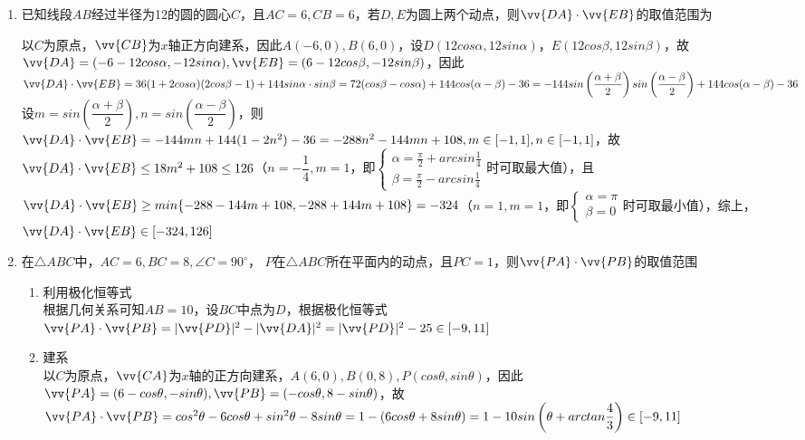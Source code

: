 \begin{enumerate}
\item 已知线段$AB$经过半径为12的圆的圆心$C$，且$AC=6, CB = 6$，若$D, E$为圆上两个动点，则$\vv{DA} \cdot \vv{EB}$的取值范围为\blkda[3]{$[-324, 126]$}
\begin{jieda}
    以$C$为原点，$\vv{CB}$为$x$轴正方向建系，因此$A(-6, 0), B(6, 0)$，设$D(12cos\alpha, 12sin\alpha)$，$E(12cos\beta, 12sin\beta)$，故$\vv{DA} = (-6-12cos\alpha, -12sin\alpha), \vv{EB} = (6 - 12cos\beta, -12sin\beta)$，因此$\vv{DA} \cdot \vv{EB} = 36(1+2cos\alpha)(2cos\beta-1) + 144 sin\alpha \cdot sin\beta = 72( cos\beta- cos\alpha ) + 144cos(\alpha - \beta) - 36 = -144sin\left(\dfrac{\alpha+\beta}{2}\right)sin\left(\dfrac{\alpha-\beta}{2}\right) + 144cos(\alpha - \beta) - 36$\\
    设$m = sin\left(\dfrac{\alpha+\beta}{2}\right), n = sin\left(\dfrac{\alpha-\beta}{2}\right)$，则$\vv{DA} \cdot \vv{EB} = -144mn + 144(1-2n^2) - 36 = -288n^2-144mn+108, m \in [-1, 1], n \in [-1, 1]$，故$\vv{DA} \cdot \vv{EB} \leq 18m^2 + 108 \leq 126$（$n=-\dfrac{1}{4}, m=1$，即$\left\{\begin{array}{l}
         \alpha = \frac{\pi}{2} + arcsin \frac{1}{4} \\
         \beta = \frac{\pi}{2} - arcsin \frac{1}{4}
    \end{array}\right.$时可取最大值），且$\vv{DA} \cdot \vv{EB} \geq min\{-288-144m+108, -288+144m+108\} = -324$（$n=1, m=1$，即$\left\{\begin{array}{l}
         \alpha = \pi \\
         \beta = 0
    \end{array}\right.$时可取最小值），综上，$\vv{DA} \cdot \vv{EB} \in [-324, 126]$
\end{jieda}
\item 在$\triangle{ABC}$中，$AC = 6, BC = 8, \angle C = 90^{\circ}$， $P$在$\triangle{ABC}$所在平面内的动点，且$PC = 1$，则$\vv{PA} \cdot \vv{PB}$的取值范围\blkda{$[-9, 11]$}
\begin{jieda}
    \begin{enumerate}
        \item 利用极化恒等式 \\
        根据几何关系可知$AB = 10$，设$BC$中点为$D$，根据极化恒等式$\vv{PA} \cdot \vv{PB} = |\vv{PD}|^2 - |\vv{DA}|^2 = |\vv{PD}|^2 - 25 \in [-9, 11]$
        \item 建系 \\
        以$C$为原点，$\vv{CA}$为$x$轴的正方向建系，$A(6, 0), B(0, 8), P(cos\theta, sin\theta)$，因此$\vv{PA} = (6-cos\theta, -sin\theta), \vv{PB} = (-cos\theta, 8-sin\theta)$，故$\vv{PA} \cdot \vv{PB} = cos^2\theta - 6cos\theta + sin^2\theta -8sin\theta = 1-(6cos\theta+8sin\theta) = 1-10sin\left(\theta+arctan\dfrac{4}{3}\right) \in [-9, 11]$

\end{enumerate}
\end{jieda}
\end{enumerate}
